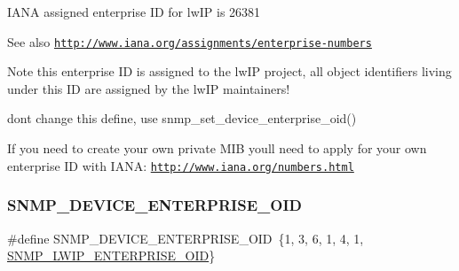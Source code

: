 I\+A\+NA assigned enterprise ID for lw\+IP is 26381 \begin{DoxySeeAlso}{See also}
\href{http://www.iana.org/assignments/enterprise-numbers}{\tt http\+://www.\+iana.\+org/assignments/enterprise-\/numbers}
\end{DoxySeeAlso}
\begin{DoxyNote}{Note}
this enterprise ID is assigned to the lw\+IP project, all object identifiers living under this ID are assigned by the lw\+IP maintainers! 

don\textquotesingle{}t change this define, use snmp\+\_\+set\+\_\+device\+\_\+enterprise\+\_\+oid()
\end{DoxyNote}
If you need to create your own private M\+IB you\textquotesingle{}ll need to apply for your own enterprise ID with I\+A\+NA\+: \href{http://www.iana.org/numbers.html}{\tt http\+://www.\+iana.\+org/numbers.\+html} \mbox{\label{group__snmp__opts_ga09118b734e85df152af098744e888b34}} 
\subsubsection{\texorpdfstring{S\+N\+M\+P\+\_\+\+D\+E\+V\+I\+C\+E\+\_\+\+E\+N\+T\+E\+R\+P\+R\+I\+S\+E\+\_\+\+O\+ID}{SNMP\_DEVICE\_ENTERPRISE\_OID}\hspace{0.1cm}{\footnotesize\ttfamily [2/2]}}
{\footnotesize\ttfamily \#define S\+N\+M\+P\+\_\+\+D\+E\+V\+I\+C\+E\+\_\+\+E\+N\+T\+E\+R\+P\+R\+I\+S\+E\+\_\+\+O\+ID~\{1, 3, 6, 1, 4, 1, \hyperlink{group__snmp__opts_ga868bfef6efe05515c86291137a633479}{S\+N\+M\+P\+\_\+\+L\+W\+I\+P\+\_\+\+E\+N\+T\+E\+R\+P\+R\+I\+S\+E\+\_\+\+O\+ID}\}}

